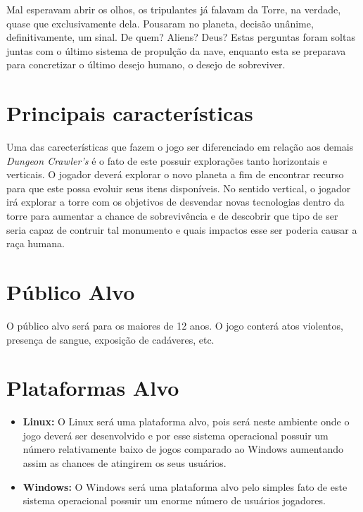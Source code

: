 \documentclass[11pt]{article} %
\begin{document}
Mal esperavam abrir os olhos, os tripulantes já falavam da Torre, na verdade, quase que exclusivamente dela. Pousaram no planeta, decisão unânime, definitivamente, um sinal. De quem? Aliens? Deus? Estas perguntas foram soltas juntas com o último sistema de propulção da nave, enquanto esta se preparava para concretizar o último desejo humano, o desejo de sobreviver.

\section*{Principais características}

Uma das carecterísticas que fazem o jogo ser diferenciado em relação aos demais \textit{Dungeon Crawler's} é o fato de este possuir explorações tanto horizontais e verticais. O jogador deverá explorar o novo planeta a fim de encontrar recurso para que este possa evoluir seus itens disponíveis. No sentido vertical, o jogador irá explorar a torre com os objetivos de desvendar novas tecnologias dentro da torre para aumentar a chance de sobrevivência e de descobrir que tipo de ser seria capaz de contruir tal monumento e quais impactos esse ser poderia causar a raça humana.

\section*{Público Alvo}

O público alvo será para os maiores de 12 anos. O jogo conterá atos violentos, presença de sangue, exposição de cadáveres, etc.

\section*{Plataformas Alvo}
\begin{itemize}
\item \textbf{Linux:} O Linux será uma plataforma alvo, pois será neste ambiente onde o jogo deverá ser desenvolvido e por esse sistema operacional possuir um número relativamente baixo de jogos comparado ao Windows aumentando assim as chances de atingirem os seus usuários. 

\item \textbf{Windows:} O Windows será uma plataforma alvo pelo simples fato de este sistema operacional possuir um enorme número de usuários jogadores.
\end{itemize}
\end{document}
